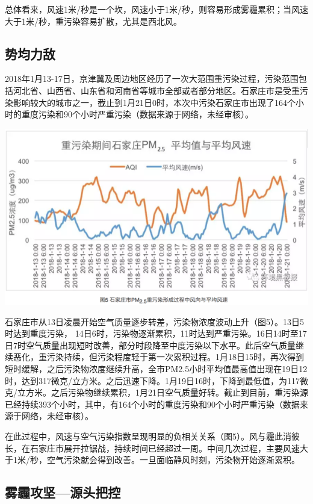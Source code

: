 \documentclass[
]{book}
\begin{document}
总体看来，风速1米/秒是一个坎，风速小于1米/秒，则容易形成雾霾累积；当风速大于1米/秒，重污染容易扩散，尤其是西北风。

\hypertarget{ux52bfux5747ux529bux654c}{%
\subsection{势均力敌}\label{ux52bfux5747ux529bux654c}}

2018年1月13-17日，京津冀及周边地区经历了一次大范围重污染过程，污染范围包括河北省、山西省、山东省和河南省等城市全部或者部分地区。石家庄市是受重污染影响较大的城市之一，截止到1月21日0时，本次中污染石家庄市出现了164个小时的重度污染和90个小时严重污染（数据来源于网络，未经审核）。

\includegraphics[width=8.33in]{images/windhaze7}

石家庄市从13日凌晨开始空气质量逐步转差，污染物浓度波动上升（图5）。13日5时达到重度污染， 14日6时，污染物逐渐累积，11时达到严重污染。16日14时至17日7时空气质量出现短时改善，部分时段降至中度污染以下水平。此后空气质量继续恶化，重污染持续，但污染程度轻于第一次累积过程。1月18日15时，再次得到短时缓解，之后污染物浓度继续升高，全市PM2.5小时平均值最高值出现在19日12时，达到317微克/立方米。之后迅速下降。1月19日16时，下降到最低值，为117微克/立方米。之后污染物继续累积，1月21日空气质量好转。截止到目前，重污染源已经持续393个小时，其中，有164个小时的重度污染和90个小时严重污染（数据来源于网络，未经审核）。

在此过程中，风速与空气污染指数呈现明显的负相关关系（图5）。风与霾此消彼长，在石家庄市展开拉锯战，持续时间已经超过一周。中间几次过程，主要风速大于1米/秒，空气污染就会得到改善。一旦面临静风时刻，污染物开始逐渐累积。

\hypertarget{ux96feux973eux653bux575aux6e90ux5934ux628aux63a7}{%
\subsection{雾霾攻坚---源头把控}\label{ux96feux973eux653bux575aux6e90ux5934ux628aux63a7}}
\end{document}
